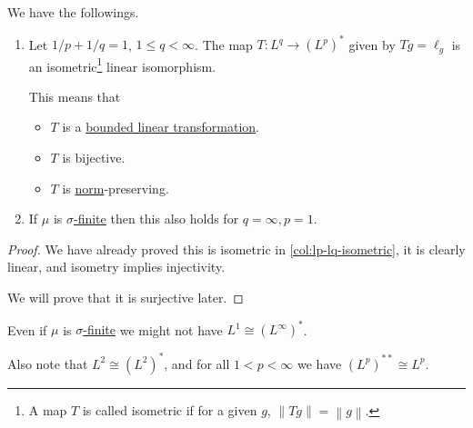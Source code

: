 \begin{theorem}
	We have the followings.
	\begin{enumerate}
		\item Let \(1/p + 1/q = 1\), \(1 \leq q < \infty\). The map \(T \colon L^q \to (L^p)^\ast\) given by \(Tg = \ell_g\) is an isometric\footnote{A map \(T\) is called isometric if for a given \(g\), \(\left\lVert Tg\right\rVert = \left\lVert g\right\rVert \).}
		      linear isomorphism.

		      This means that
		      \begin{itemize}
			      \item \(T\) is a \hyperref[def:bounded-linear-transformation]{bounded linear transformation}.
			      \item \(T\) is bijective.
			      \item \(T\) is \hyperref[def:norm]{norm}-preserving.
		      \end{itemize}
		\item If \(\mu\) is \hyperref[def:sigma-finite-measure]{\(\sigma\)-finite} then this also holds for \(q = \infty, p = 1\).
	\end{enumerate}
\end{theorem}
\begin{proof}
	We have already proved this is isometric in \autoref{col:lp-lq-isometric}, it is clearly linear, and isometry implies injectivity.

	We will prove that it is surjective later.
\end{proof}
\begin{note}
	Even if \(\mu\) is \hyperref[def:sigma-finite-measure]{\(\sigma\)-finite} we might not have \(L^1 \cong (L^\infty)^\ast\).

	Also note that \(L^2 \cong (L^2)^\ast\), and for all \(1 < p < \infty\) we have \((L^p)^{\ast\ast} \cong L^p\).
\end{note}